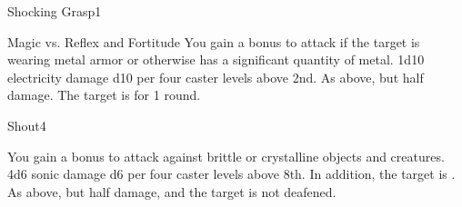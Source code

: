 \begin{spellsection}{Shocking Grasp}{1}
\begin{spellheader}
    \begin{spelltargetinginfo}
    \end{spelltargetinginfo}
\end{spellheader}
\begin{spellcontent}
    \begin{spelleffects}
        \begin{spellattack}{Magic vs. Reflex and Fortitude}
            \spellspecial You gain a  bonus to attack if the target is wearing metal armor or otherwise has a significant quantity of metal.
            \spellsuccess[Reflex] 1d10 electricity damage \add d10 per four caster levels above 2nd.
            \spellfailure[Reflex] As above, but half damage.
             The target is \staggered for 1 round.
        \end{spellattack}
    \end{spelleffects}
\end{spellcontent}
\begin{spellfooter}
\end{spellfooter}
\end{spellsection}

\begin{spellsection}{Shout}{4}
\begin{spellheader}
    \begin{spelltargetinginfo}
    \end{spelltargetinginfo}
\end{spellheader}
\begin{spellcontent}
    \begin{spelleffects}
        \spellspecial You gain a  bonus to attack against brittle or crystalline objects and creatures.
        \spellsuccess 4d6 sonic damage \add d6 per four caster levels above 8th. In addition, the target is \deafened.
        \spellfailure As above, but half damage, and the target is not deafened.
    \end{spelleffects}
\end{spellcontent}
\begin{spellfooter}
\end{spellfooter}
\end{spellsection}

